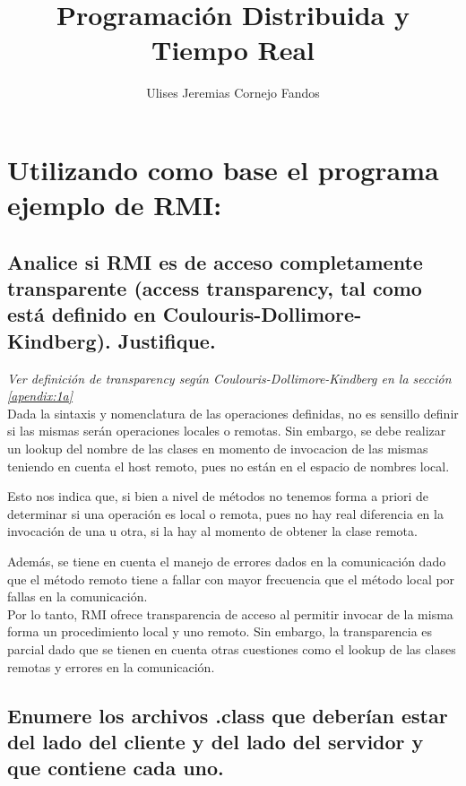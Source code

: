 \documentclass[osajnl,twocolumn,showpacs,superscriptaddress,10pt]{revtex4-1} %
\begin{document}
\title{Programación Distribuida y Tiempo Real}

\author{Ulises Jeremias Cornejo Fandos}

\maketitle %

\section{Utilizando como base el programa ejemplo de RMI:}

\subsection{Analice si RMI es de acceso completamente transparente (access transparency, tal como 
está definido en Coulouris-Dollimore-Kindberg). Justifique.}

\textit{Ver definición de transparency según Coulouris-Dollimore-Kindberg en la sección \ref{apendix:1a}} \\

Dada la sintaxis y nomenclatura de las operaciones definidas, no es sensillo definir si las mismas
serán operaciones locales o remotas. Sin embargo, se debe realizar un lookup del nombre de las clases
en momento de invocacion de las mismas teniendo en cuenta el host remoto, pues no están en el
espacio de nombres local.

Esto nos indica que, si bien a nivel de métodos no tenemos forma a priori de determinar si una
operación es local o remota, pues no hay real diferencia en la invocación de una u otra,
si la hay al momento de obtener la clase remota.

Además, se tiene en cuenta el manejo de errores dados en la comunicación dado que el método
remoto tiene a fallar con mayor frecuencia que el método local por fallas en la comunicación. \\

Por lo tanto, RMI ofrece transparencia de acceso al permitir invocar de la misma forma un procedimiento
local y uno remoto. Sin embargo, la transparencia es parcial dado que se tienen en cuenta
otras cuestiones como el lookup de las clases remotas y errores en la comunicación.

\subsection{Enumere los archivos .class que deberían estar del lado del cliente y del lado del servidor y
que contiene cada uno.}
\end{document}
